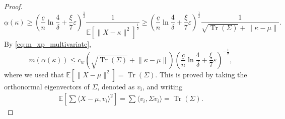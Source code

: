 \documentclass{article}
\theoremstyle{plain}
\theoremstyle{definition}
\DeclareMathOperator{\tr}{Tr}
\begin{document}
\begin{appendix}
\begin{proof}
		\begin{equation*}
			\underline{\alpha}(\kappa)\geq\left(\frac{\underline{c}}{n}\ln\frac{4}{\delta }+\frac{\xi }{7}\varepsilon  \right)^{\frac{1}{2}}\frac{1}{\mathbb{E}[\lVert X-\kappa\rVert^2]^{\frac{1}{2}}}\geq\left(\frac{\underline{c} }{n}\ln\frac{4}{\delta } + \frac{\xi }{7}\varepsilon  \right)^{\frac{1}{2}}\frac{1}{\sqrt{ \tr(\Sigma)}+\lVert \kappa-\mu\rVert}.
		\end{equation*}
		By \eqref{eq:m_xp_multivariate},
		\begin{equation}\label{eq:malpha_bound_multivariate}
			m(\underline{\alpha}(\kappa))\leq c_w (\sqrt{ \tr(\Sigma)}+\lVert \kappa-\mu\rVert)\left(\frac{\underline{c} }{n}\ln\frac{4}{\delta }+ \frac{\xi }{7}\varepsilon \right)^{-\frac{1}{2}},
		\end{equation}
    where we used that \( \mathbb{E}\left[\lVert X-\mu  \rVert^2\right]=\tr(\Sigma)\). This is proved by taking the orthonormal eigenvectors of \( \Sigma \), denoted as \( v_i \), and writing \begin{align*}
      \mathbb{E}\left[\sum \langle X- \mu , v_i \rangle^2\right]=\sum \langle v_i, \Sigma v_i \rangle = \tr(\Sigma). 
    \end{align*} 


\end{proof}
\end{appendix}
\end{document}
